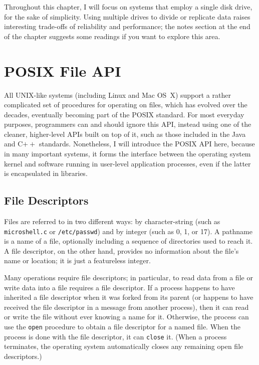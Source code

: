 Throughout this chapter, I will focus on systems
that employ a single disk drive, for the sake of simplicity.  Using
multiple drives to divide or replicate data raises interesting
trade-offs of reliability and performance; the notes section at the
end of the chapter suggests some readings if you want to explore this
area.

\section{POSIX File API}\label{posix-file-api-section}

All UNIX-like systems (including Linux and Mac OS~X) support a rather
complicated set of procedures for operating on files, which has
evolved over the decades, eventually becoming part of the POSIX
standard.  For most everyday purposes, programmers can and should
ignore this API, instead using one of the cleaner, higher-level APIs
built on top of it, such as those included in the Java and C$++$
standards.  Nonetheless, I will introduce the POSIX API here,
because in many important systems, it forms the interface between the
operating system kernel and software running in user-level application
processes, even if the latter is encapsulated in libraries.

\subsection{File Descriptors}

Files are referred to in two different ways: by character-string
(such as {\tt microshell.c} or {\tt /etc/passwd}) and by integer
 (such as 0, 1, or 17).
A pathname is a name of a file, optionally including a sequence of
directories used to reach it.  A file descriptor, on the other hand,
provides no information about the file's name or location; it is just
a featureless integer.

Many operations
require file descriptors; in particular, to read data from a file or
write data into a file requires a file descriptor.  If a process
happens to have inherited a file descriptor when it was forked from
its parent (or happens to have received the file descriptor in a
message from another process), then it can read or write the file
without ever knowing a name for it.  Otherwise, the process can use
the \verb|open| procedure to obtain a file
descriptor for a named file.  When the process is done
with the file descriptor, it can
\verb|close| it.  (When a process
terminates, the operating system automatically closes any remaining
open file descriptors.)

